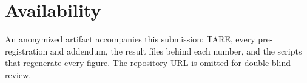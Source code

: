\documentclass[letterpaper,twocolumn,10pt]{article}
\theoremstyle{definition}
\newcommand{\sys}{TARE\xspace}
\newcommand{\sys}{PARE\xspace}
\begin{document}
\section*{Availability}
An anonymized artifact accompanies this submission: \sys, every pre\nobreakdash-registration and addendum, the result files behind each number, and the scripts that regenerate every figure. The repository URL is omitted for double\nobreakdash-blind review.



\end{document}
